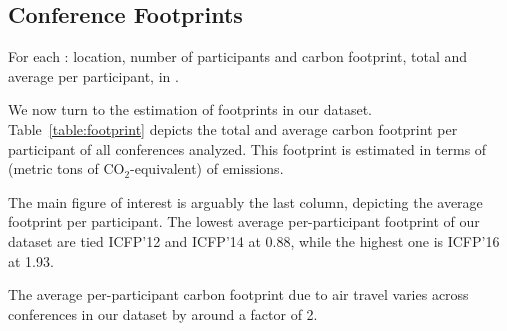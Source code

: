 \subsection{Conference Footprints}


\begin{table}
  \centering
  \label{table:footprint}
  \caption{For each \event: location, number of participants and carbon footprint,
    total and average per participant, in \gazunitbis. }
\end{table}

We now turn to the estimation of footprints in our
dataset.
Table~\ref{table:footprint} depicts the total and average carbon footprint per participant of
all conferences analyzed. This footprint is estimated in terms of \gazunitbis{}
(metric tons of CO$_2$-equivalent) of emissions.

The main figure of interest is arguably the last column, depicting the
average footprint per participant.  The lowest average per-participant footprint of
our dataset are tied ICFP'12 and ICFP'14 at 0.88\gazunitbis, while the
highest one is ICFP'16 at 1.93\gazunitbis.

\begin{obs}
The average per-participant carbon footprint due to air travel varies across
conferences in our dataset by around a factor of 2.
\label{obs:footprint}
\end{obs}
